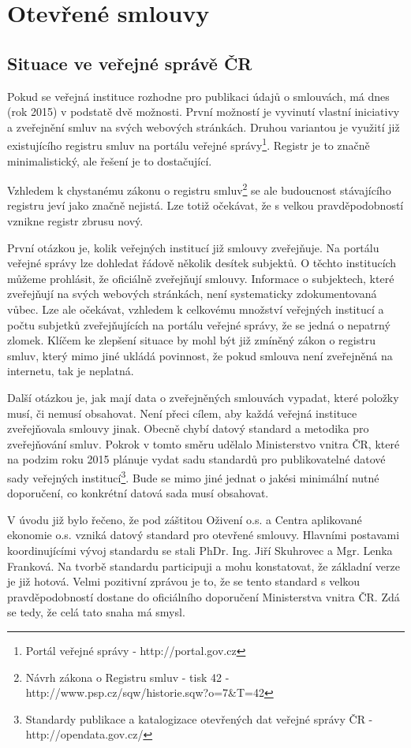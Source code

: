 \chapter{Otevřené smlouvy}

\section{Situace ve veřejné správě ČR}

Pokud se veřejná instituce rozhodne pro publikaci údajů o smlouvách, má dnes (rok 2015) v podstatě dvě možnosti. První možností je vyvinutí vlastní iniciativy a zveřejnění smluv na svých webových stránkách. Druhou variantou je využití již existujícího registru smluv na portálu veřejné správy\footnote{Portál veřejné správy - http://portal.gov.cz}. Registr je to značně minimalistický, ale řešení je to dostačující.

Vzhledem k chystanému zákonu o registru smluv\footnote{Návrh zákona o Registru smluv - tisk 42 - http://www.psp.cz/sqw/historie.sqw?o=7\&T=42} se ale budoucnost stávajícího registru jeví jako značně nejistá. Lze totiž očekávat, že s velkou pravděpodobností vznikne registr zbrusu nový.

První otázkou je, kolik veřejných institucí již smlouvy zveřejňuje. Na portálu veřejné správy lze dohledat řádově několik desítek subjektů. O těchto institucích můžeme prohlásit, že oficiálně zveřejňují smlouvy. Informace o subjektech, které zveřejňují na svých webových stránkách, není systematicky zdokumentovaná vůbec. Lze ale očekávat, vzhledem k celkovému množství veřejných institucí a počtu subjetků zveřejňujících na portálu veřejné správy, že se jedná o nepatrný zlomek. Klíčem ke zlepšení situace by mohl být již zmíněný zákon o registru smluv, který mimo jiné ukládá povinnost, že pokud smlouva není zveřejněná na internetu, tak je neplatná.

Další otázkou je, jak mají data o zveřejněných smlouvách vypadat, které položky musí, či nemusí obsahovat. Není přeci cílem, aby každá veřejná instituce zveřejňovala smlouvy jinak. Obecně chybí datový standard a metodika pro zveřejňování smluv. Pokrok v tomto směru udělalo Ministerstvo vnitra ČR, které na podzim roku 2015 plánuje vydat sadu standardů pro publikovatelné datové sady veřejných institucí\footnote{Standardy publikace a katalogizace otevřených dat veřejné správy ČR - http://opendata.gov.cz/}. Bude se mimo jiné jednat o jakési minimální nutné doporučení, co konkrétní datová sada musí obsahovat.

V úvodu již bylo řečeno, že pod záštitou Oživení o.s. a Centra aplikované ekonomie o.s. vzniká datový standard pro otevřené smlouvy. Hlavními postavami koordinujícími vývoj standardu se stali PhDr. Ing. Jiří Skuhrovec a Mgr. Lenka Franková. Na tvorbě standardu participuji a mohu konstatovat, že základní verze je již hotová. Velmi pozitivní zprávou je to, že se tento standard s velkou pravděpodobností dostane do oficiálního doporučení Ministerstva vnitra ČR. Zdá se tedy, že celá tato snaha má smysl.

